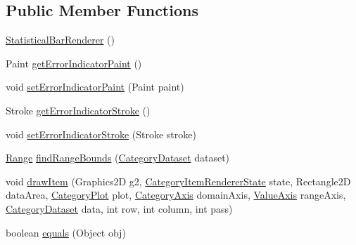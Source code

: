 \subsection*{Public Member Functions}
\begin{DoxyCompactItemize}
\item 
\mbox{\hyperlink{classorg_1_1jfree_1_1chart_1_1renderer_1_1category_1_1_statistical_bar_renderer_a92dfcd807a86b9f3e0c4a9e7454a5b77}{Statistical\+Bar\+Renderer}} ()
\item 
Paint \mbox{\hyperlink{classorg_1_1jfree_1_1chart_1_1renderer_1_1category_1_1_statistical_bar_renderer_adf1749e835752e57cb21e5c52f4ddeb6}{get\+Error\+Indicator\+Paint}} ()
\item 
void \mbox{\hyperlink{classorg_1_1jfree_1_1chart_1_1renderer_1_1category_1_1_statistical_bar_renderer_a51a43129656c76dc6134e5b9b4bc65bd}{set\+Error\+Indicator\+Paint}} (Paint paint)
\item 
Stroke \mbox{\hyperlink{classorg_1_1jfree_1_1chart_1_1renderer_1_1category_1_1_statistical_bar_renderer_a12a547abd30256cc05729bd86bcb7084}{get\+Error\+Indicator\+Stroke}} ()
\item 
void \mbox{\hyperlink{classorg_1_1jfree_1_1chart_1_1renderer_1_1category_1_1_statistical_bar_renderer_a5858ebcf353d862a3a30986c4e2ef65f}{set\+Error\+Indicator\+Stroke}} (Stroke stroke)
\item 
\mbox{\hyperlink{classorg_1_1jfree_1_1data_1_1_range}{Range}} \mbox{\hyperlink{classorg_1_1jfree_1_1chart_1_1renderer_1_1category_1_1_statistical_bar_renderer_a73c393df8708c42a18167f1d800dc816}{find\+Range\+Bounds}} (\mbox{\hyperlink{interfaceorg_1_1jfree_1_1data_1_1category_1_1_category_dataset}{Category\+Dataset}} dataset)
\item 
void \mbox{\hyperlink{classorg_1_1jfree_1_1chart_1_1renderer_1_1category_1_1_statistical_bar_renderer_a9f36762a214eec216b94e65cb0af07b2}{draw\+Item}} (Graphics2D g2, \mbox{\hyperlink{classorg_1_1jfree_1_1chart_1_1renderer_1_1category_1_1_category_item_renderer_state}{Category\+Item\+Renderer\+State}} state, Rectangle2D data\+Area, \mbox{\hyperlink{classorg_1_1jfree_1_1chart_1_1plot_1_1_category_plot}{Category\+Plot}} plot, \mbox{\hyperlink{classorg_1_1jfree_1_1chart_1_1axis_1_1_category_axis}{Category\+Axis}} domain\+Axis, \mbox{\hyperlink{classorg_1_1jfree_1_1chart_1_1axis_1_1_value_axis}{Value\+Axis}} range\+Axis, \mbox{\hyperlink{interfaceorg_1_1jfree_1_1data_1_1category_1_1_category_dataset}{Category\+Dataset}} data, int row, int column, int pass)
\item 
boolean \mbox{\hyperlink{classorg_1_1jfree_1_1chart_1_1renderer_1_1category_1_1_statistical_bar_renderer_a07d09d71c02f793338f0c9039e47f871}{equals}} (Object obj)
\end{DoxyCompactItemize}
